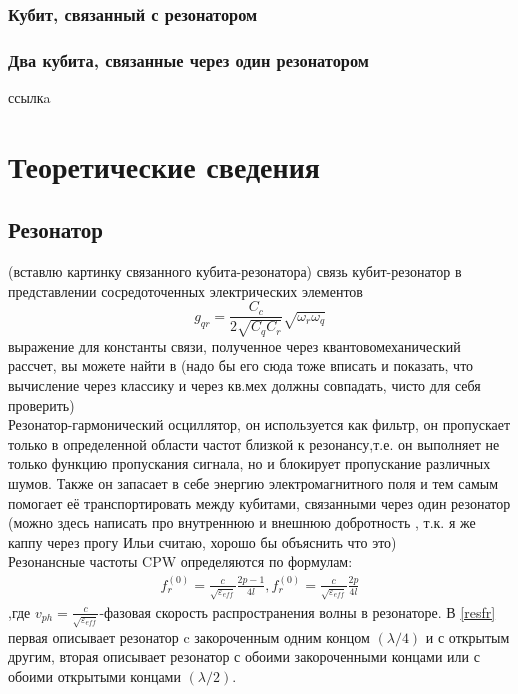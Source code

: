 \documentclass[12pt, twoside]{report}
\begin{document}
		\subsection{Кубит, связанный с резонатором}

		\subsection{Два кубита, связанные через один резонатором}
ссылкa\cite{Gu2017}





\chapter{Теоретические сведения} \label{chap:theory}
	\section{Резонатор}
(вставлю картинку связанного кубита-резонатора)
связь кубит-резонатор в представлении сосредоточенных электрических элементов
	\begin{equation}
	g_{qr}=\frac{C_c}{2\sqrt{C_q C_r}}\sqrt{\omega_r \omega_q}
	\label{eq:g_qr}
	\end{equation}
выражение для константы связи, полученное через квантовомеханический рассчет, вы можете найти в \cite{Koch2007}(надо бы его сюда тоже вписать и показать, что вычисление через классику и через кв.мех должны совпадать, чисто для себя проверить)\\
Резонатор-гармонический осциллятор, он используется как фильтр, он пропускает только в определенной области частот близкой к резонансу,т.е. он выполняет не только функцию пропускания сигнала, но и блокирует пропускание 
различных шумов\cite{Naturwissenschaften2013}. Также он запасает в себе энергию электромагнитного поля и тем самым помогает её транспортировать между кубитами, связанными через один резонатор \cite{Kelly2015}
(можно здесь написать про внутреннюю и внешнюю добротность , т.к. я же каппу через прогу Ильи считаю, хорошо бы объяснить что это) \\
Резонансные частоты CPW определяются по формулам:
	\begin{align}
	\label{resfr}
	f^{(0)}_r=\frac{c}{\sqrt{\varepsilon_{eff}}}\frac{2p-1}{4l}, 
	f^{(0)}_r=\frac{c}{\sqrt{\varepsilon_{eff}}}\frac{2p}{4l}
	\end{align}
,где $v_{ph}=\frac{c}{\sqrt{\varepsilon_{eff}}}$-фазовая скорость распространения волны в резонаторе. В \eqref{resfr} первая описывает резонатор c закороченным одним концом $(\lambda/4)$ и с открытым другим, вторая описывает резонатор с обоими закороченными концами или с обоими открытыми концами $(\lambda/2)$. 
	
\end{document}
